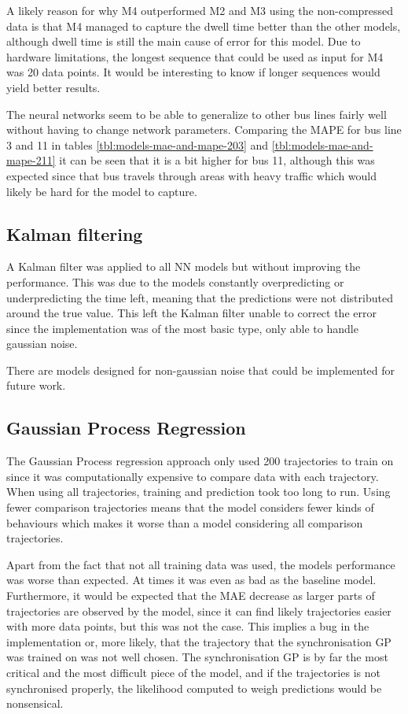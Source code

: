 A likely reason for why M4 outperformed M2 and M3 using the non-compressed data is that M4 managed to capture the dwell time better than the other models, although dwell time is still the main cause of error for this model. Due to hardware limitations, the longest sequence that could be used as input for M4 was 20 data points. It would be interesting to know if longer sequences would yield better results.

The neural networks seem to be able to generalize to other bus lines fairly well without having to change network parameters. Comparing the MAPE for bus line 3 and 11 in tables \ref{tbl:models-mae-and-mape-203} and \ref{tbl:models-mae-and-mape-211} it can be seen that it is a bit higher for bus 11, although this was expected since that bus travels through areas with heavy traffic which would likely be hard for the model to capture.

\subsection{Kalman filtering}
A Kalman filter was applied to all NN models but without improving the performance. This was due to the models constantly overpredicting or underpredicting the time left, meaning that the predictions were not distributed around the true value. This left the Kalman filter unable to correct the error since the implementation was of the most basic type, only able to handle gaussian noise. 

There are models designed for non-gaussian noise that could be implemented for future work.

\subsection{Gaussian Process Regression}
The Gaussian Process regression approach only used 200 trajectories to train on since it was computationally expensive to compare data with each trajectory. When using all trajectories, training and prediction took too long to run. Using fewer comparison trajectories means that the model considers fewer kinds of behaviours which makes it worse than a model considering all comparison trajectories.

Apart from the fact that not all training data was used, the models performance was worse than expected. At times it was even as bad as the baseline model. Furthermore, it would be expected that the MAE decrease as larger parts of trajectories are observed by the model, since it can find likely trajectories easier with more data points, but this was not the case. This implies a bug in the implementation or, more likely, that the trajectory that the synchronisation GP was trained on was not well chosen. The synchronisation GP is by far the most critical and the most difficult piece of the model, and if the trajectories is not synchronised properly, the likelihood computed to weigh predictions would be nonsensical. 

